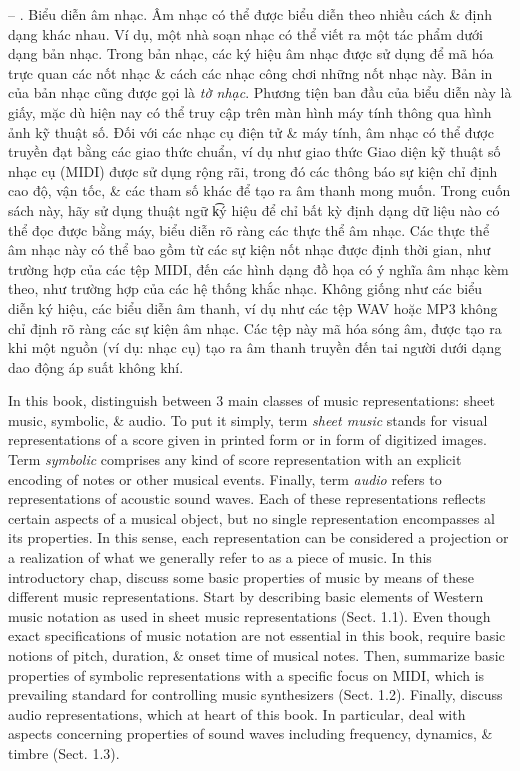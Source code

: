 \documentclass{article}
\begin{document}
\begin{itemize}
	-- {. Biểu diễn âm nhạc.} Âm nhạc có thể được biểu diễn theo nhiều cách \& định dạng khác nhau. Ví dụ, một nhà soạn nhạc có thể viết ra một tác phẩm dưới dạng bản nhạc. Trong bản nhạc, các ký hiệu âm nhạc được sử dụng để mã hóa trực quan các nốt nhạc \& cách các nhạc công chơi những nốt nhạc này. Bản in của bản nhạc cũng được gọi là {\it tờ nhạc}. Phương tiện ban đầu của biểu diễn này là giấy, mặc dù hiện nay có thể truy cập trên màn hình máy tính thông qua hình ảnh kỹ thuật số. Đối với các nhạc cụ điện tử \& máy tính, âm nhạc có thể được truyền đạt bằng các giao thức chuẩn, ví dụ như giao thức Giao diện kỹ thuật số nhạc cụ (MIDI) được sử dụng rộng rãi, trong đó các thông báo sự kiện chỉ định cao độ, vận tốc, \& các tham số khác để tạo ra âm thanh mong muốn. Trong cuốn sách này, hãy sử dụng thuật ngữ {\t ký hiệu} để chỉ bất kỳ định dạng dữ liệu nào có thể đọc được bằng máy, biểu diễn rõ ràng các thực thể âm nhạc. Các thực thể âm nhạc này có thể bao gồm từ các sự kiện nốt nhạc được định thời gian, như trường hợp của các tệp MIDI, đến các hình dạng đồ họa có ý nghĩa âm nhạc kèm theo, như trường hợp của các hệ thống khắc nhạc. Không giống như các biểu diễn ký hiệu, các biểu diễn âm thanh, ví dụ như các tệp WAV hoặc MP3 không chỉ định rõ ràng các sự kiện âm nhạc. Các tệp này mã hóa sóng âm, được tạo ra khi một nguồn (ví dụ: nhạc cụ) tạo ra âm thanh truyền đến tai người dưới dạng dao động áp suất không khí.
	
	In this book, distinguish between 3 main classes of music representations: sheet music, symbolic, \& audio. To put it simply, term {\it sheet music} stands for visual representations of a score given in printed form or in form of digitized images. Term {\it symbolic} comprises any kind of score representation with an explicit encoding of notes or other musical events. Finally, term {\it audio} refers to representations of acoustic sound waves. Each of these representations reflects certain aspects of a musical object, but no single representation encompasses al its properties. In this sense, each representation can be considered a projection or a realization of what we generally refer to as a piece of music. In this introductory chap, discuss some basic properties of music by means of these different music representations. Start by describing basic elements of Western music notation as used in sheet music representations (Sect. 1.1). Even though exact specifications of music notation are not essential in this book, require basic notions of pitch, duration, \& onset time of musical notes. Then, summarize basic properties of symbolic representations with a specific focus on MIDI, which is prevailing standard for controlling music synthesizers (Sect. 1.2). Finally, discuss audio representations, which at heart of this book. In particular, deal with aspects concerning properties of sound waves including frequency, dynamics, \& timbre (Sect. 1.3).
	

\end{itemize}
\end{document}
